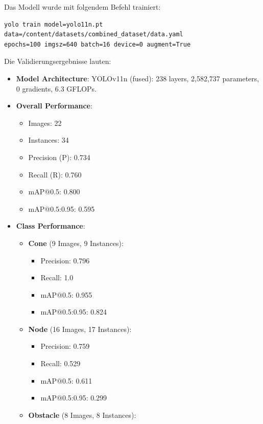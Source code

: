 Das Modell wurde mit folgendem Befehl trainiert:


\begin{verbatim}
yolo train model=yolo11n.pt data=/content/datasets/combined_dataset/data.yaml 
epochs=100 imgsz=640 batch=16 device=0 augment=True
\end{verbatim}

Die Validierungsergebnisse lauten:

\begin{itemize}
    \item \textbf{Model Architecture}: YOLOv11n (fused): 238 layers, 2,582,737 parameters, 0 gradients, 6.3 GFLOPs.
    \item \textbf{Overall Performance}:
    \begin{itemize}
        \item Images: 22
        \item Instances: 34
        \item Precision (P): 0.734
        \item Recall (R): 0.760
        \item mAP@0.5: 0.800
        \item mAP@0.5:0.95: 0.595
    \end{itemize}
    \item \textbf{Class Performance}:
    \begin{itemize}
        \item \textbf{Cone} (9 Images, 9 Instances):
        \begin{itemize}
            \item Precision: 0.796
            \item Recall: 1.0
            \item mAP@0.5: 0.955
            \item mAP@0.5:0.95: 0.824
        \end{itemize}
        \item \textbf{Node} (16 Images, 17 Instances):
        \begin{itemize}
            \item Precision: 0.759
            \item Recall: 0.529
            \item mAP@0.5: 0.611
            \item mAP@0.5:0.95: 0.299
        \end{itemize}
        \item \textbf{Obstacle} (8 Images, 8 Instances):
        \begin{itemize}

\end{itemize}
\end{itemize}
\end{itemize}
